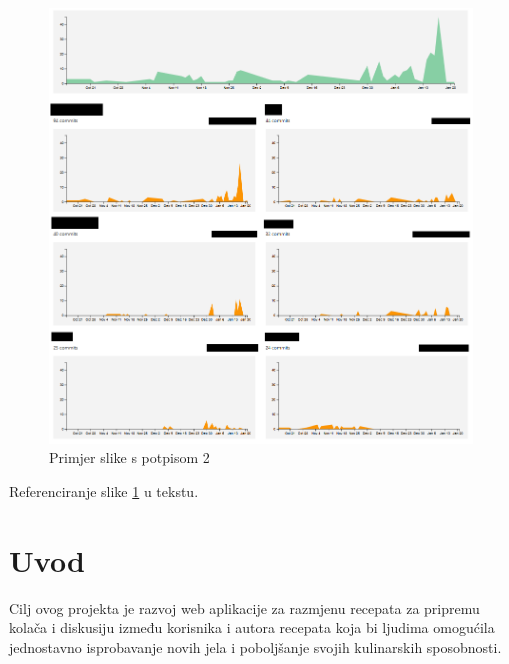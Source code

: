 		\begin{figure}[H]
			\includegraphics[width=\textwidth]{slike/aktivnost.PNG} %
			\caption{Primjer slike s potpisom 2}
			\label{fig:promjene2} %
		\end{figure}
		
		Referenciranje slike \ref{fig:promjene2} u tekstu.
		
		\eject
		
		\section{Uvod}
		\raggedright Cilj ovog projekta je razvoj web aplikacije za razmjenu recepata za pripremu kolača i diskusiju između korisnika i autora recepata koja bi ljudima omogućila jednostavno isprobavanje novih jela i poboljšanje svojih kulinarskih sposobnosti.
